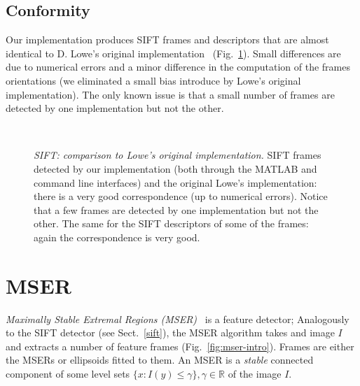 \documentclass[9pt]{article}
\newcommand{\real}{\ensuremath{\mathbb{R}}}
\begin{document}
\subsection{Conformity}\label{sift.conformity}

Our implementation produces SIFT frames and descriptors that are
almost identical to D. Lowe's original
implementation~\cite{lowe07sift}
(Fig.~\ref{fig:sift-conformity}). Small differences are due to
numerical errors and a minor difference in the computation of the
frames orientations (we eliminated a small bias introduce by Lowe's
original implementation). The only known issue is that a small number
of frames are detected by one implementation but not the other.

\begin{figure}
\begin{center}
\hfill
{}\\
\end{center}
\caption{{\em SIFT: comparison to Lowe's original implementation.}
  \protect{} SIFT frames detected by our
  implementation (both through the MATLAB and command line interfaces)
  and the original Lowe's implementation: there is a very good
  correspondence (up to numerical errors).  Notice that a few frames
  are detected by one implementation but not the other.
  \protect{} The same for the SIFT descriptors
  of some of the frames: again the correspondence is very good.}
\label{fig:sift-conformity}
\end{figure}

\section{MSER}\label{mser}

{\em Maximally Stable Extremal Regions (MSER)}~\cite{matas03robust} is
a feature detector; Analogously to the SIFT detector (see
Sect.~\ref{sift}), the MSER algorithm takes and image $I$ and extracts
a number of feature frames (Fig.~\ref{fig:mser-intro}). Frames are
either the MSERs or ellipsoids fitted to them. An MSER is a {\em
  stable} connected component of some level sets
$\{x:I(y)\leq\gamma\}, \gamma\in\real$ of the image $I$.
\end{document}
